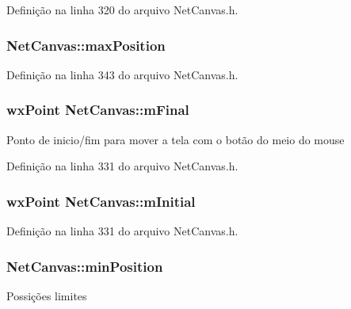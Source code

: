 Definição na linha 320 do arquivo Net\+Canvas.\+h.

\subsubsection[{max\+Position}]{ Net\+Canvas\+::max\+Position\hspace{0.3cm}{\ttfamily [protected]}}\label{class_net_canvas_a0db2937ce45dea052c9c7023673477dd}


Definição na linha 343 do arquivo Net\+Canvas.\+h.

\subsubsection[{m\+Final}]{\setlength{\rightskip}{0pt plus 5cm}wx\+Point Net\+Canvas\+::m\+Final\hspace{0.3cm}{\ttfamily [protected]}}\label{class_net_canvas_a5e835b1fae14ce73410ac0dc151fe62f}
Ponto de inicio/fim para mover a tela com o botão do meio do mouse 

Definição na linha 331 do arquivo Net\+Canvas.\+h.

\subsubsection[{m\+Initial}]{\setlength{\rightskip}{0pt plus 5cm}wx\+Point Net\+Canvas\+::m\+Initial\hspace{0.3cm}{\ttfamily [protected]}}\label{class_net_canvas_a144cd19a580f670a08ab838490fa34ec}


Definição na linha 331 do arquivo Net\+Canvas.\+h.

\subsubsection[{min\+Position}]{ Net\+Canvas\+::min\+Position\hspace{0.3cm}{\ttfamily [protected]}}\label{class_net_canvas_a726f5a596200fff9265eec21a868cded}
Possições limites 

